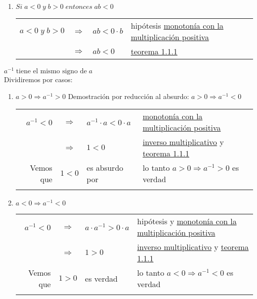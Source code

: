 \begin{teo}
\begin{enumerate}[C1.-]
\item $Si \; a<0 \; y \; b>0 \; entonces \; ab<0 $
\begin{center}
\begin{tabular}{r c l l}
$a<0 \; y \; b>0$&$\Rightarrow$&$ab<0\cdot b$&hipótesis \hyperref[O4]{monotonía con la multiplicación positiva}\\
&$\Rightarrow$&$ab<0$&\hyperref[teo 1.1.1]{teorema 1.1.1}\\
\end{tabular}
\end{center}
\end{enumerate}
\end{teo}


\begin{teo}
$a^{-1} \; \mbox{tiene el mismo signo de}\; a$\\ \label{teo 1.2.8}
Dividiremos por casos:
\begin{enumerate}
\item $a > 0 \Rightarrow a^{-1} > 0$ Demostración por reducción al absurdo: $a > 0 \Rightarrow a^{-1} < 0$
\begin{center}
\begin{tabular}{r c l l}
$a^{-1}<0$&$\Rightarrow$&$a^{-1}\cdot a < 0 \cdot a$&\hyperref[O4]{monotonía con la multiplicación positiva}\\
&$\Rightarrow$&$1<0$&\hyperref[M5]{inverso multiplicativo} y \hyperref[teo 1.1.1]{teorema 1.1.1}\\
Vemos que &$1<0$&es absurdo por&lo tanto $a > 0 \Rightarrow a^{-1} > 0$ es verdad \\\\
\end{tabular}
\end{center}
\item $a < 0 \Rightarrow a^{-1} < 0$
\begin{center}
\begin{tabular}{r c l l}
$a^{-1} < 0$&$\Rightarrow$&$a\cdot a^{-1} > 0\cdot a$&hipótesis y \hyperref[O4]{monotonía con la multiplicación positiva}\\
&$\Rightarrow$&$1>0$&\hyperref[M5]{inverso multiplicativo} y \hyperref[teo 1.1.1]{teorema 1.1.1}\\
Vemos que &$1>0$&es verdad&lo tanto $a < 0 \Rightarrow a^{-1} < 0$ es verdad \\\\
\end{tabular}
\end{center}
\end{enumerate}
\end{teo}

